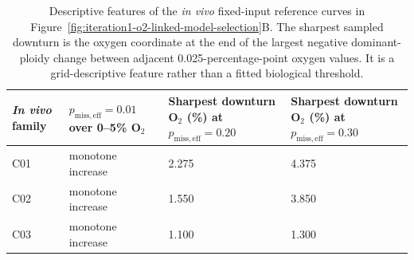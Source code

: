 \begin{table}[!htbp]
\centering
\scriptsize
\setlength{\tabcolsep}{4pt}
\caption{Descriptive features of the \textit{in vivo} fixed-input reference curves in Figure~\ref{fig:iteration1-o2-linked-model-selection}B. The sharpest sampled downturn is the oxygen coordinate at the end of the largest negative dominant-ploidy change between adjacent 0.025-percentage-point oxygen values. It is a grid-descriptive feature rather than a fitted biological threshold.}
\label{tab:figure6_fixed_input_summary}
\begin{tabular}{@{}p{}p{}p{}p{}@{}}
\toprule
\textit{In vivo} family & $p_{\mathrm{miss,eff}}=0.01$ over 0--5\% O$_2$ & Sharpest downturn O$_2$ (\%) at $p_{\mathrm{miss,eff}}=0.20$ & Sharpest downturn O$_2$ (\%) at $p_{\mathrm{miss,eff}}=0.30$ \\
\midrule
C01 & monotone increase & 2.275 & 4.375 \\
C02 & monotone increase & 1.550 & 3.850 \\
C03 & monotone increase & 1.100 & 1.300 \\
\bottomrule
\end{tabular}
\end{table}
